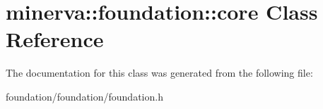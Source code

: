 \hypertarget{classminerva_1_1foundation_1_1core}{}\section{minerva\+:\+:foundation\+:\+:core Class Reference}
\label{classminerva_1_1foundation_1_1core}


The documentation for this class was generated from the following file\+:\begin{DoxyCompactItemize}
\item 
foundation/foundation/foundation.\+h\end{DoxyCompactItemize}
